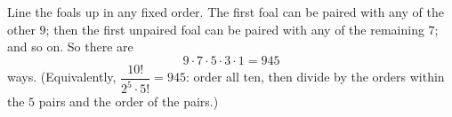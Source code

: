 Line the foals up in any fixed order. The first foal can be paired with any of the other $9$; then the first unpaired foal can be paired with any of the remaining $7$; and so on. So there are
\[9\cdot7\cdot5\cdot3\cdot1=\boxed{945}\]
ways. (Equivalently, $\dfrac{10!}{2^5\cdot5!}=945$: order all ten, then divide by the orders within the $5$ pairs and the order of the pairs.)
